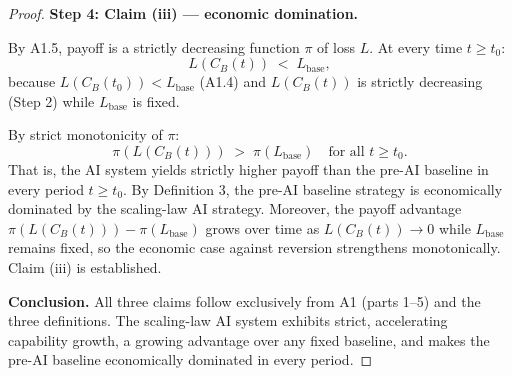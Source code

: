 \begin{proof}
\medskip
\noindent\textbf{Step 4: Claim (iii) — economic domination.}

By A1.5, payoff is a strictly decreasing function $\pi$ of loss $L$.
At every time $t \geq t_0$:
\[
  L(C_B(t)) \;<\; L_{\mathrm{base}},
\]
because $L(C_B(t_0)) < L_{\mathrm{base}}$ (A1.4) and $L(C_B(t))$ is
strictly decreasing (Step 2) while $L_{\mathrm{base}}$ is fixed.

By strict monotonicity of $\pi$:
\[
  \pi\!\left(L(C_B(t))\right) \;>\; \pi\!\left(L_{\mathrm{base}}\right)
  \quad \text{for all } t \geq t_0.
\]
That is, the AI system yields strictly higher payoff than the pre-AI
baseline in every period $t \geq t_0$.  By Definition 3, the pre-AI
baseline strategy is economically dominated by the scaling-law AI strategy.
Moreover, the payoff advantage $\pi(L(C_B(t))) - \pi(L_{\mathrm{base}})$
grows over time as $L(C_B(t)) \to 0$ while $L_{\mathrm{base}}$ remains
fixed, so the economic case against reversion strengthens monotonically.
Claim (iii) is established.

\medskip
\noindent\textbf{Conclusion.}
All three claims follow exclusively from A1 (parts 1--5) and the three
definitions.  The scaling-law AI system exhibits strict, accelerating
capability growth, a growing advantage over any fixed baseline, and
makes the pre-AI baseline economically dominated in every period.
\end{proof}


